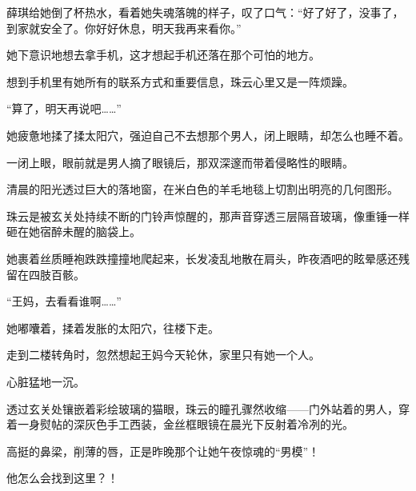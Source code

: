 \documentclass[12pt,a4paper]{article}
\begin{document}
薛琪给她倒了杯热水，看着她失魂落魄的样子，叹了口气：“好了好了，没事了，到家就安全了。你好好休息，明天我再来看你。”



她下意识地想去拿手机，这才想起手机还落在那个可怕的地方。



想到手机里有她所有的联系方式和重要信息，珠云心里又是一阵烦躁。



“算了，明天再说吧……”



她疲惫地揉了揉太阳穴，强迫自己不去想那个男人，闭上眼睛，却怎么也睡不着。



一闭上眼，眼前就是男人摘了眼镜后，那双深邃而带着侵略性的眼睛。



清晨的阳光透过巨大的落地窗，在米白色的羊毛地毯上切割出明亮的几何图形。



珠云是被玄关处持续不断的门铃声惊醒的，那声音穿透三层隔音玻璃，像重锤一样砸在她宿醉未醒的脑袋上。



她裹着丝质睡袍跌跌撞撞地爬起来，长发凌乱地散在肩头，昨夜酒吧的眩晕感还残留在四肢百骸。



“王妈，去看看谁啊……”



她嘟囔着，揉着发胀的太阳穴，往楼下走。



走到二楼转角时，忽然想起王妈今天轮休，家里只有她一个人。



心脏猛地一沉。



透过玄关处镶嵌着彩绘玻璃的猫眼，珠云的瞳孔骤然收缩——门外站着的男人，穿着一身熨帖的深灰色手工西装，金丝框眼镜在晨光下反射着冷冽的光。



高挺的鼻梁，削薄的唇，正是昨晚那个让她午夜惊魂的“男模”！



他怎么会找到这里？！
\end{document}
